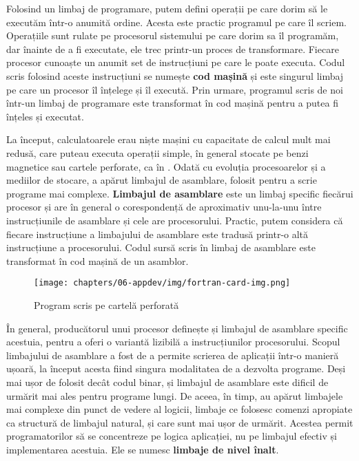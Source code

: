 Folosind un limbaj de programare, putem defini operații pe care dorim să le
executăm într-o anumită ordine. Acesta este practic programul pe care îl scriem.
Operațiile sunt rulate pe procesorul sistemului pe care dorim sa îl programăm,
dar înainte de a fi executate, ele trec printr-un proces de transformare.
Fiecare procesor cunoaște un anumit set de instrucțiuni pe care le poate
executa. Codul scris folosind aceste instrucțiuni se numește \textbf{cod mașină} și este
singurul limbaj pe care un procesor îl înțelege și îl execută. Prin urmare,
programul scris de noi într-un limbaj de programare este transformat în cod
mașină pentru a putea fi înțeles și executat.

La început, calculatoarele erau niște mașini cu capacitate de calcul mult mai
redusă, care puteau executa operații simple, în general stocate pe benzi
magnetice sau cartele perforate, ca în . Odată cu evoluția procesoarelor și a mediilor de
stocare, a apărut limbajul de asamblare, folosit pentru a scrie programe mai
complexe. \textbf{Limbajul de asamblare} este un limbaj specific fiecărui procesor și are
în general o corespondență de aproximativ unu-la-unu între instrucțiunile de
asamblare și cele are procesorului. Practic, putem considera că fiecare
instrucțiune a limbajului de asamblare este tradusă printr-o altă instrucțiune a
procesorului. Codul sursă scris în limbaj de asamblare este transformat în cod
mașină de un asamblor.

\begin{figure}[!htbp]
	\centering
	\texttt{[image: chapters/06-appdev/img/fortran-card-img.png]}
	\caption{Program scris pe cartelă perforată\protect\footnotemark}
	\label{fig:appdev:card}
\end{figure}


În general, producătorul unui procesor definește și limbajul de asamblare
specific acestuia, pentru a oferi o variantă lizibilă a instrucțiunilor
procesorului. Scopul limbajului de asamblare a fost de a permite scrierea de
aplicații într-o manieră ușoară, la început acesta fiind singura modalitatea de
a dezvolta programe. Deși mai ușor de folosit decât codul binar, și limbajul de
asamblare este dificil de urmărit mai ales pentru programe lungi. De aceea, în
timp, au apărut limbajele mai complexe din punct de vedere al logicii, limbaje
ce folosesc comenzi apropiate ca structură de limbajul natural, și care sunt mai
ușor de urmărit. Acestea permit programatorilor să se concentreze pe logica
aplicației, nu pe limbajul efectiv și implementarea acestuia. Ele se numesc
\textbf{limbaje de nivel înalt}.

